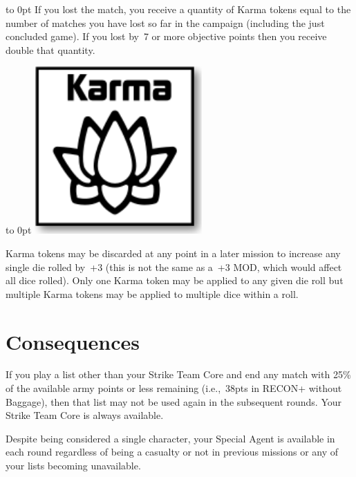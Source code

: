 \vspace*{-9pt}
\begin{minipage}[t]{\linewidth-0.75in-2em}\vbox to 0pt{}
If you lost the match, you receive a quantity of Karma tokens equal to
the number of matches you have lost so far in the campaign (including
the just concluded game).  If you lost by~7 or more objective points
then you receive double that quantity.  
\end{minipage}\hfill
\begin{minipage}[t]{0.75in}\vbox to 0pt{}
\includegraphics[width=\linewidth]{art/icons/karma2}
\end{minipage}

Karma tokens may be discarded at any point in a later mission to
increase any single die rolled by~+3 (this is not the same as a~+3
MOD, which would affect all dice rolled).  Only one Karma token may be
applied to any given die roll but multiple Karma tokens may be applied
to multiple dice within a roll.

\section{Consequences}

If you play a list other than your Strike Team Core and end any match
with 25\% of the available army points or less remaining (i.e.,~38pts
in RECON+ without Baggage), then that list may not be used again in
the subsequent rounds.  Your Strike Team Core is always available.

Despite being considered a single character, your Special Agent is
available in each round regardless of being a casualty or not in
previous missions or any of your lists becoming unavailable.
